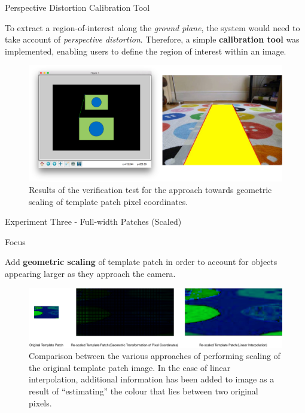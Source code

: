 \documentclass[10pt, compress]{beamer}
\begin{document}
\begin{frame}{Perspective Distortion Calibration Tool}

\vspace{-5pt}

To extract a region-of-interest along the \textit{ground plane}, the system would need to take account of \textit{perspective distortion}. Therefore, a simple \textbf{calibration tool} was implemented, enabling users to define the region of interest within an image.

 \begin{figure}[ht!]
\centering
\includegraphics[scale=0.19]{calib_tool}
\vspace{-10pt}
 \caption{{\small Results of the verification test for the approach towards geometric scaling of template patch pixel coordinates.}}
\end{figure}

\end{frame}


\begin{frame}{Experiment Three - Full-width Patches (Scaled)}

\begin{block}{Focus}

Add \textbf{geometric scaling} of template patch in order to account for objects appearing larger as they approach the camera. 
	
\end{block}
 \vspace{15pt}
  \begin{figure}[ht!]
\centering
\includegraphics[scale=0.28]{scaling_types}
 \caption{{\small Comparison between the various approaches of performing scaling of the original template patch image. In the case of linear interpolation, additional information has been added to image as a result of “estimating” the colour that lies between two original pixels.}}
\end{figure}

\end{frame}
\end{document}
